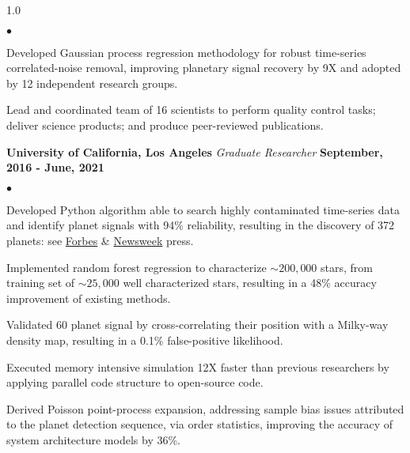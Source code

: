 \documentclass[margin,line, 12pt]{res}
\newenvironment{list2}{
  \begin{list}{$\bullet$}{%
      \setlength{\itemsep}{0.0in}
      \setlength{\parsep}{0in} \setlength{\parskip}{0in}
      \setlength{\topsep}{0.0in} \setlength{\partopsep}{0in}
      \setlength{\leftmargin}{0.2in}}}{\end{list}}
\begin{document}
\begin{spacing}{1.0}
\begin{resume}
\begin{list2}
	\item Developed Gaussian process regression methodology for robust time-series correlated-noise removal, improving planetary signal recovery by 9X and adopted by 12 independent research groups.
	
	
	\item Lead and coordinated team of 16 scientists to perform quality control tasks; deliver science products; and produce peer-reviewed publications.

	
	\end{list2}		


\textbf{University of California, Los Angeles} \newline
\textit{Graduate Researcher} \hfill \textbf{September, 2016 - June, 2021}\newline
	\begin{list2}
		\vspace*{-5mm}
	\item Developed Python algorithm able to search highly contaminated time-series data and identify planet signals with 94\% reliability, resulting in the discovery of 372 planets: see \href{https://www.forbes.com/sites/jamiecartereurope/2021/06/11/we-found-372-new-alien-planets-using-a-long-dead-telescope-say-scientists/}{Forbes} \& \href{https://www.newsweek.com/astronomers-discover-366-new-worlds-gas-giants-kepler-k2-exoplanets-nasa-1653254}{Newsweek} press.
	
	\item Implemented random forest regression to characterize $\sim200,000$ stars, from training set of $\sim25,000$ well characterized stars, resulting in a 48\% accuracy improvement of existing methods.
	
	\item Validated 60 planet signal by cross-correlating their position with a Milky-way density map, resulting in a 0.1\% false-positive likelihood.
	
	\item Executed memory intensive simulation 12X faster than previous researchers by applying parallel code structure to open-source code.
	
	\item Derived Poisson point-process expansion, addressing sample bias issues attributed to the planet detection sequence, via order statistics, improving the accuracy of system architecture models by 36\%.
	

\end{list2}
\end{resume}
\end{spacing}
\end{document}
